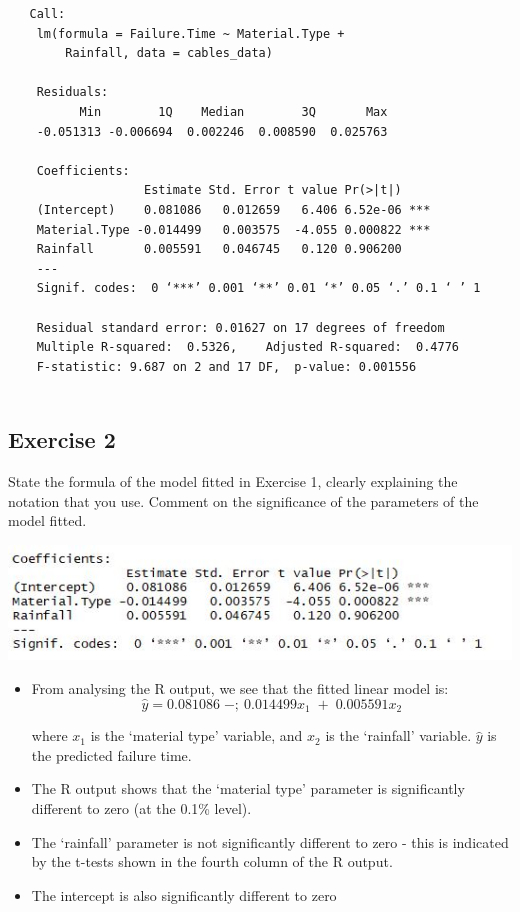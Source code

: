 \documentclass[a4paper,12pt]{article}
\begin{document}
\newpage 
\begin{verbatim}
   Call:
    lm(formula = Failure.Time ~ Material.Type +
        Rainfall, data = cables_data)
    
    Residuals:
          Min        1Q    Median        3Q       Max 
    -0.051313 -0.006694  0.002246  0.008590  0.025763 
    
    Coefficients:
                   Estimate Std. Error t value Pr(>|t|)    
    (Intercept)    0.081086   0.012659   6.406 6.52e-06 ***
    Material.Type -0.014499   0.003575  -4.055 0.000822 ***
    Rainfall       0.005591   0.046745   0.120 0.906200    
    ---
    Signif. codes:  0 ‘***’ 0.001 ‘**’ 0.01 ‘*’ 0.05 ‘.’ 0.1 ‘ ’ 1
    
    Residual standard error: 0.01627 on 17 degrees of freedom
    Multiple R-squared:  0.5326,	Adjusted R-squared:  0.4776 
    F-statistic: 9.687 on 2 and 17 DF,  p-value: 0.001556
    
\end{verbatim}    
 

\newpage 
\subsection*{Exercise 2}

State the formula of the model fitted in Exercise 1, clearly explaining the
notation that you use.
Comment on the significance of the parameters of the model fitted.


\includegraphics[scale=1.3]{00-A1/images/CablesData_2_modelsummary.JPG}


\noindent
\begin{itemize}
    \item From analysing the R output, we see that the fitted linear model is:
\[ \hat{y} = 0.081086 \;-;\ 0.014499x_1 \;+\; 0.005591x_2\]

where $x_1$ is the ‘material type’ variable, and $x_2$ is the ‘rainfall’ variable. $\hat{y}$ is the predicted failure time.


\item The R output shows that the ‘material type’ parameter is significantly
different to zero (at the 0.1\% level).
\item The ‘rainfall’ parameter is not significantly different to zero - this is
indicated by the t-tests shown in the fourth column of the R output.
\item The intercept is also significantly different to zero
\end{itemize}
\end{document}
